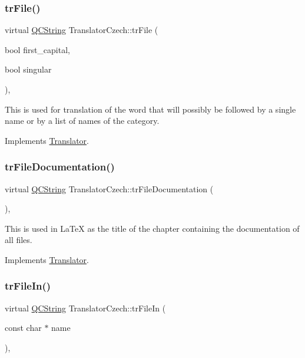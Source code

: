 \subsubsection{\texorpdfstring{trFile()}{trFile()}}
{\footnotesize\ttfamily virtual \mbox{\hyperlink{class_q_c_string}{Q\+C\+String}} Translator\+Czech\+::tr\+File (\begin{DoxyParamCaption}\item[{bool}]{first\+\_\+capital,  }\item[{bool}]{singular }\end{DoxyParamCaption})\hspace{0.3cm}{\ttfamily [inline]}, {\ttfamily [virtual]}}

This is used for translation of the word that will possibly be followed by a single name or by a list of names of the category. 

Implements \mbox{\hyperlink{class_translator}{Translator}}.

\mbox{\label{class_translator_czech_a17925aa8b188c03a62fce4488846a162}} 
\subsubsection{\texorpdfstring{trFileDocumentation()}{trFileDocumentation()}}
{\footnotesize\ttfamily virtual \mbox{\hyperlink{class_q_c_string}{Q\+C\+String}} Translator\+Czech\+::tr\+File\+Documentation (\begin{DoxyParamCaption}{ }\end{DoxyParamCaption})\hspace{0.3cm}{\ttfamily [inline]}, {\ttfamily [virtual]}}

This is used in La\+TeX as the title of the chapter containing the documentation of all files. 

Implements \mbox{\hyperlink{class_translator}{Translator}}.

\mbox{\label{class_translator_czech_aea66b74447bd8dc6a9ef326d8e3edb05}} 
\subsubsection{\texorpdfstring{trFileIn()}{trFileIn()}}
{\footnotesize\ttfamily virtual \mbox{\hyperlink{class_q_c_string}{Q\+C\+String}} Translator\+Czech\+::tr\+File\+In (\begin{DoxyParamCaption}\item[{const char $\ast$}]{name }\end{DoxyParamCaption})\hspace{0.3cm}{\ttfamily [inline]}, {\ttfamily [virtual]}}

